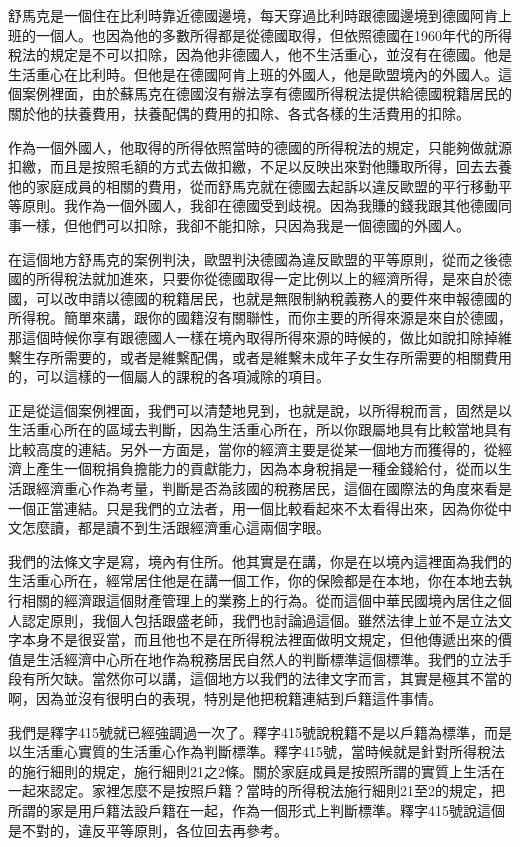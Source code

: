 \documentclass[oneside,sub3section]{ctexbook}
\begin{document}
舒馬克是一個住在比利時靠近德國邊境，每天穿過比利時跟德國邊境到德國阿肯上班的一個人。也因為他的多數所得都是從德國取得，但依照德國在1960年代的所得稅法的規定是不可以扣除，因為他非德國人，他不生活重心，並沒有在德國。他是生活重心在比利時。但他是在德國阿肯上班的外國人，他是歐盟境內的外國人。這個案例裡面，由於蘇馬克在德國沒有辦法享有德國所得稅法提供給德國稅籍居民的關於他的扶養費用，扶養配偶的費用的扣除、各式各樣的生活費用的扣除。

作為一個外國人，他取得的所得依照當時的德國的所得稅法的規定，只能夠做就源扣繳，而且是按照毛額的方式去做扣繳，不足以反映出來對他賺取所得，回去去養他的家庭成員的相關的費用，從而舒馬克就在德國去起訴以違反歐盟的平行移動平等原則。我作為一個外國人，我卻在德國受到歧視。因為我賺的錢我跟其他德國同事一樣，但他們可以扣除，我卻不能扣除，只因為我是一個德國的外國人。

在這個地方舒馬克的案例判決，歐盟判決德國為違反歐盟的平等原則，從而之後德國的所得稅法就加進來，只要你從德國取得一定比例以上的經濟所得，是來自於德國，可以改申請以德國的稅籍居民，也就是無限制納稅義務人的要件來申報德國的所得稅。簡單來講，跟你的國籍沒有關聯性，而你主要的所得來源是來自於德國，那這個時候你享有跟德國人一樣在境內取得所得來源的時候的，做比如說扣除掉維繫生存所需要的，或者是維繫配偶，或者是維繫未成年子女生存所需要的相關費用的，可以這樣的一個屬人的課稅的各項減除的項目。

正是從這個案例裡面，我們可以清楚地見到，也就是說，以所得稅而言，固然是以生活重心所在的區域去判斷，因為生活重心所在，所以你跟屬地具有比較當地具有比較高度的連結。另外一方面是，當你的經濟主要是從某一個地方而獲得的，從經濟上產生一個稅捐負擔能力的貢獻能力，因為本身稅捐是一種金錢給付，從而以生活跟經濟重心作為考量，判斷是否為該國的稅務居民，這個在國際法的角度來看是一個正當連結。只是我們的立法者，用一個比較看起來不太看得出來，因為你從中文怎麼讀，都是讀不到生活跟經濟重心這兩個字眼。

我們的法條文字是寫，境內有住所。他其實是在講，你是在以境內這裡面為我們的生活重心所在，經常居住他是在講一個工作，你的保險都是在本地，你在本地去執行相關的經濟跟這個財產管理上的業務上的行為。從而這個中華民國境內居住之個人認定原則，我個人包括跟盛老師，我們也討論過這個。雖然法律上並不是立法文字本身不是很妥當，而且他也不是在所得稅法裡面做明文規定，但他傳遞出來的價值是生活經濟中心所在地作為稅務居民自然人的判斷標準這個標準。我們的立法手段有所欠缺。當然你可以講，這個地方以我們的法律文字而言，其實是極其不當的啊，因為並沒有很明白的表現，特別是他把稅籍連結到戶籍這件事情。

我們是釋字415號就已經強調過一次了。釋字415號說稅籍不是以戶籍為標準，而是以生活重心實質的生活重心作為判斷標準。釋字415號，當時候就是針對所得稅法的施行細則的規定，施行細則21之2條。關於家庭成員是按照所謂的實質上生活在一起來認定。家裡怎麼不是按照戶籍？當時的所得稅法施行細則21至2的規定，把所謂的家是用戶籍法設戶籍在一起，作為一個形式上判斷標準。釋字415號說這個是不對的，違反平等原則，各位回去再參考。
\end{document}
